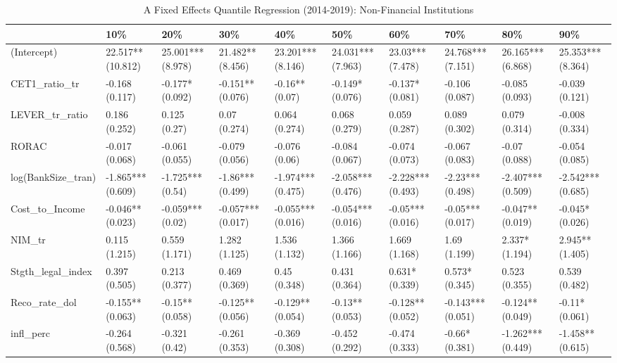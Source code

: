 \begin{table}[ht]
\centering
\caption{A Fixed Effects Quantile Regression (2014-2019): Non-Financial Institutions} 
\begingroup\small
\begin{tabular}{llllllllll}
  \toprule
 & 10\% & 20\% & 30\% & 40\% & 50\% & 60\% & 70\% & 80\% & 90\% \\ 
  \midrule
(Intercept) & 22.517** (10.812) & 25.001*** (8.978) & 21.482** (8.456) & 23.201*** (8.146) & 24.031*** (7.963) & 23.03*** (7.478) & 24.768*** (7.151) & 26.165*** (6.868) & 25.353*** (8.364) \\ 
  CET1\_ratio\_tr & -0.168 (0.117) & -0.177* (0.092) & -0.151** (0.076) & -0.16** (0.07) & -0.149* (0.076) & -0.137* (0.081) & -0.106 (0.087) & -0.085 (0.093) & -0.039 (0.121) \\ 
  LEVER\_tr\_ratio & 0.186 (0.252) & 0.125 (0.27) & 0.07 (0.274) & 0.064 (0.274) & 0.068 (0.279) & 0.059 (0.287) & 0.089 (0.302) & 0.079 (0.314) & -0.008 (0.334) \\ 
  RORAC & -0.017 (0.068) & -0.061 (0.055) & -0.079 (0.056) & -0.076 (0.06) & -0.084 (0.067) & -0.074 (0.073) & -0.067 (0.083) & -0.07 (0.088) & -0.054 (0.085) \\ 
  log(BankSize\_tran) & -1.865*** (0.609) & -1.725*** (0.54) & -1.86*** (0.499) & -1.974*** (0.475) & -2.058*** (0.476) & -2.228*** (0.493) & -2.23*** (0.498) & -2.407*** (0.509) & -2.542*** (0.685) \\ 
  Cost\_to\_Income & -0.046** (0.023) & -0.059*** (0.02) & -0.057*** (0.017) & -0.055*** (0.016) & -0.054*** (0.016) & -0.05*** (0.016) & -0.05*** (0.017) & -0.047** (0.019) & -0.045* (0.026) \\ 
  NIM\_tr & 0.115 (1.215) & 0.559 (1.171) & 1.282 (1.125) & 1.536 (1.132) & 1.366 (1.166) & 1.669 (1.168) & 1.69 (1.199) & 2.337* (1.194) & 2.945** (1.405) \\ 
  Stgth\_legal\_index & 0.397 (0.505) & 0.213 (0.377) & 0.469 (0.369) & 0.45 (0.348) & 0.431 (0.364) & 0.631* (0.339) & 0.573* (0.345) & 0.523 (0.355) & 0.539 (0.482) \\ 
  Reco\_rate\_dol & -0.155** (0.063) & -0.15** (0.058) & -0.125** (0.056) & -0.129** (0.054) & -0.13** (0.053) & -0.128** (0.052) & -0.143*** (0.051) & -0.124** (0.049) & -0.11* (0.061) \\ 
  infl\_perc & -0.264 (0.568) & -0.321 (0.42) & -0.261 (0.353) & -0.369 (0.308) & -0.452 (0.292) & -0.474 (0.333) & -0.66* (0.381) & -1.262*** (0.449) & -1.458** (0.615) \\ 

\end{tabular}
\end{table}
